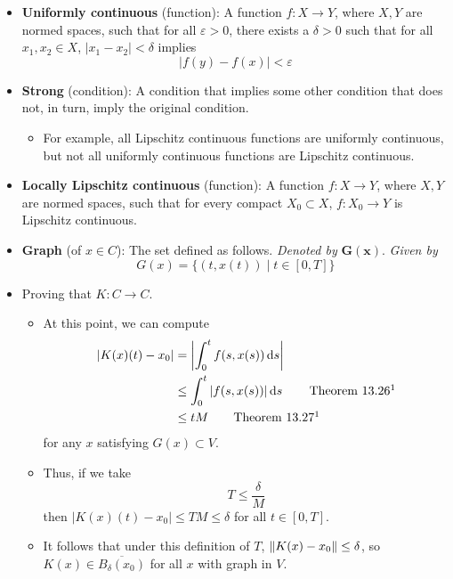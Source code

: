 \documentclass[../notes.tex]{subfiles}
\begin{document}
\begin{itemize}
\begin{itemize}
    \end{itemize}
    \item \textbf{Uniformly continuous} (function): A function $f:X\to Y$, where $X,Y$ are normed spaces, such that for all $\varepsilon>0$, there exists a $\delta>0$ such that for all $x_1,x_2\in X$, $|x_1-x_2|<\delta$ implies
    \begin{equation*}
        |f(y)-f(x)| < \varepsilon
    \end{equation*}
    \item \textbf{Strong} (condition): A condition that implies some other condition that does not, in turn, imply the original condition.
    \begin{itemize}
        \item For example, all Lipschitz continuous functions are uniformly continuous, but not all uniformly continuous functions are Lipschitz continuous.
    \end{itemize}
    \item \textbf{Locally Lipschitz continuous} (function): A function $f:X\to Y$, where $X,Y$ are normed spaces, such that for every compact $X_0\subset X$, $f:X_0\to Y$ is Lipschitz continuous.
    \item \textbf{Graph} (of $x\in C$): The set defined as follows. \emph{Denoted by} $\bm{G(x)}$. \emph{Given by}
    \begin{equation*}
        G(x) = \{(t,x(t))\mid t\in[0,T]\}
    \end{equation*}
    \item Proving that $K:C\to C$.
    \begin{itemize}
        \item At this point, we can compute
        \begin{align*}
            |K(x)(t)-x_0| &= \left| \int_0^tf(s,x(s))\dd{s} \right|\\
            &\leq \int_0^t|f(s,x(s))|\dd{s}\tag*{Theorem 13.26\footnotemark}\\
            &\leq tM\tag*{Theorem 13.27\footnotemark[\value{footnote}]}
        \end{align*}
        for any $x$ satisfying $G(x)\subset V$.
        \item Thus, if we take
        \begin{equation*}
            T \leq \frac{\delta}{M}
        \end{equation*}
        then $|K(x)(t)-x_0|\leq TM\leq\delta$ for all $t\in[0,T]$.
        \item It follows that under this definition of $T$, $\norm{K(x)-x_0}\leq\delta$, so $K(x)\in\overline{B_\delta(x_0)}$ for all $x$ with graph in $V$.

\end{itemize}
\end{itemize}
\end{document}
